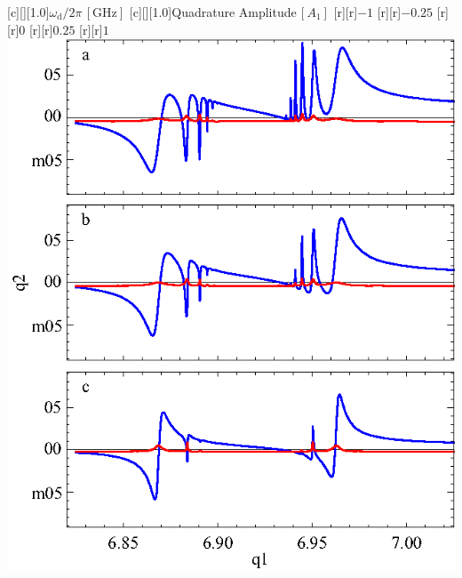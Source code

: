 

\figstyle
 [c][][1.0]{$\omega_\text{d}/2\pi\,[\text{GHz}]$}
 [c][][1.0]{Quadrature Amplitude\,$[A_1]$}
 [r][r]{$-1$}
 [r][r]{$-0.25$}
 [r][r]{$0$}
 [r][r]{$0.25$}
 [r][r]{$1$}
 \includegraphics[height=\textheight-3 in-1pt]{quadratureshipower.eps}

